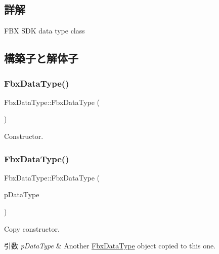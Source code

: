 \subsection{詳解}
F\+BX S\+DK data type class 

\subsection{構築子と解体子}
\mbox{\label{class_fbx_data_type_a3441ba1df35e11f7598146731bc70d70}} 
\subsubsection{\texorpdfstring{Fbx\+Data\+Type()}{FbxDataType()}\hspace{0.1cm}{\footnotesize\ttfamily [1/3]}}
{\footnotesize\ttfamily Fbx\+Data\+Type\+::\+Fbx\+Data\+Type (\begin{DoxyParamCaption}{ }\end{DoxyParamCaption})}



Constructor. 

\mbox{\label{class_fbx_data_type_ae711414e8450866b24a0c879bf5c0166}} 
\subsubsection{\texorpdfstring{Fbx\+Data\+Type()}{FbxDataType()}\hspace{0.1cm}{\footnotesize\ttfamily [2/3]}}
{\footnotesize\ttfamily Fbx\+Data\+Type\+::\+Fbx\+Data\+Type (\begin{DoxyParamCaption}\item[{const \hyperlink{class_fbx_data_type}{Fbx\+Data\+Type} \&}]{p\+Data\+Type }\end{DoxyParamCaption})}

Copy constructor. 
\begin{DoxyParams}{引数}
{\em p\+Data\+Type} & Another \hyperlink{class_fbx_data_type}{Fbx\+Data\+Type} object copied to this one. \\
\hline
\end{DoxyParams}
\mbox{\label{class_fbx_data_type_a40dc7c9a1670c754e1e31394eabec7b7}} 
